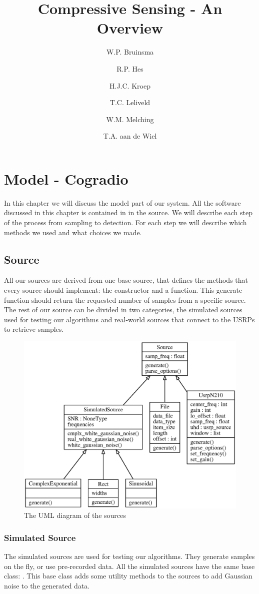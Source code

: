 \documentclass[a4paper, openany, oneside]{memoir}
\title{Compressive Sensing - An Overview}
\author{W.P. Bruinsma \and R.P. Hes \and H.J.C. Kroep \and T.C. Leliveld \and W.M. Melching \and T.A. aan de Wiel}
\begin{document}
\chapter{Model - Cogradio}
\label{cha:model}
In this chapter we will discuss the model part of our system. All the software discussed in this chapter is contained in  in the source. We will describe each step of the process from sampling to detection. For each step we will describe which methods we used and what choices we made.

\section{Source}
\label{sec:source}
All our sources are derived from one base source, that defines the methods that every source should implement: the constructor and a  function. This generate function should return the requested number of samples from a specific source. The rest of our source can be divided in two categories, the simulated sources used for testing our algorithms and real-world sources that connect to the USRPs to retrieve samples.

\begin{figure}
    \centering
    \includegraphics[width=\linewidth]{figures/classes_source.eps}
    \caption{The UML diagram of the sources}
    \label{fig:umlsource}
\end{figure}

\subsection{Simulated Source}
\label{sec:simulated-source}
The simulated sources are used for testing our algorithms. They generate samples on the fly, or use pre-recorded data. All the simulated sources have the same base class: . This base class adds some utility methods to the sources to add Gaussian noise to the generated data.
\end{document}
